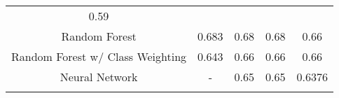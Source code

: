 \documentclass[11pt]{article}
\begin{document}
\begin{longtable}[]{@{}ccccc@{}}
\begin{minipage}[t]{0.16\columnwidth}
0.59\strut
\end{minipage}\tabularnewline
\begin{minipage}[t]{0.07\columnwidth}\centering\strut
Random Forest\strut
\end{minipage} & \begin{minipage}[t]{0.25\columnwidth}\centering\strut
0.683\strut
\end{minipage} & \begin{minipage}[t]{0.20\columnwidth}\centering\strut
0.68\strut
\end{minipage} & \begin{minipage}[t]{0.18\columnwidth}\centering\strut
0.68\strut
\end{minipage} & \begin{minipage}[t]{0.16\columnwidth}\centering\strut
0.66\strut
\end{minipage}\tabularnewline
\begin{minipage}[t]{0.07\columnwidth}\centering\strut
Random Forest w/ Class Weighting\strut
\end{minipage} & \begin{minipage}[t]{0.25\columnwidth}\centering\strut
0.643\strut
\end{minipage} & \begin{minipage}[t]{0.20\columnwidth}\centering\strut
0.66\strut
\end{minipage} & \begin{minipage}[t]{0.18\columnwidth}\centering\strut
0.66\strut
\end{minipage} & \begin{minipage}[t]{0.16\columnwidth}\centering\strut
0.66\strut
\end{minipage}\tabularnewline
\begin{minipage}[t]{0.07\columnwidth}\centering\strut
Neural Network\strut
\end{minipage} & \begin{minipage}[t]{0.25\columnwidth}\centering\strut
-\strut
\end{minipage} & \begin{minipage}[t]{0.20\columnwidth}\centering\strut
0.65\strut
\end{minipage} & \begin{minipage}[t]{0.18\columnwidth}\centering\strut
0.65\strut
\end{minipage} & \begin{minipage}[t]{0.16\columnwidth}\centering\strut
0.6376\strut
\end{minipage}\tabularnewline
\begin{minipage}[t]{0.07\columnwidth}\centering\strut

\end{minipage}
\end{longtable}
\end{document}
